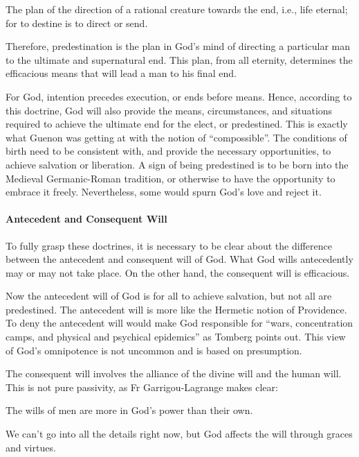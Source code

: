 \begin{quotex}
The plan of the direction of a rational creature towards the end, i.e., life eternal; for to destine is to direct or send.

\end{quotex}
Therefore, predestination is the plan in God's mind of directing a particular man to the ultimate and supernatural end. This plan, from all eternity, determines the efficacious means that will lead a man to his final end.

For God, intention precedes execution, or ends before means. Hence, according to this doctrine, God will also provide the means, circumstances, and situations required to achieve the ultimate end for the elect, or predestined. This is exactly what Guenon was getting at with the notion of “compossible”. The conditions of birth need to be consistent with, and provide the necessary opportunities, to achieve salvation or liberation. A sign of being predestined is to be born into the Medieval Germanic-Roman tradition, or otherwise to have the opportunity to embrace it freely. Nevertheless, some would spurn God's love and reject it.

\paragraph{Antecedent and Consequent Will}
To fully grasp these doctrines, it is necessary to be clear about the difference between the antecedent and consequent will of God. What God wills antecedently may or may not take place. On the other hand, the consequent will is efficacious.

Now the antecedent will of God is for all to achieve salvation, but not all are predestined. The antecedent will is more like the Hermetic notion of Providence. To deny the antecedent will would make God responsible for “wars, concentration camps, and physical and psychical epidemics” as Tomberg points out. This view of God's omnipotence is not uncommon and is based on presumption.

The consequent will involves the alliance of the divine will and the human will. This is not pure passivity, as Fr Garrigou-Lagrange makes clear:

\begin{quotex}
The wills of men are more in God's power than their own.

\end{quotex}
We can't go into all the details right now, but God affects the will through graces and virtues.

